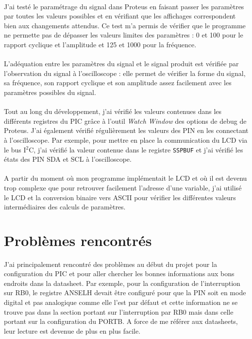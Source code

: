 \documentclass{article}
\begin{document}
    \paragraph{}
    J'ai testé le paramétrage du signal dans Proteus en faisant passer les paramètres par toutes les valeurs possibles et en vérifiant que les affichages correspondent bien aux changements attendus. Ce test m'a permis de vérifier que le programme ne permette pas de dépasser les valeurs limites des paramètres : 0 et 100 pour le rapport cyclique et l'amplitude et 125 et 1000 pour la fréquence.

    \paragraph{}
    L'adéquation entre les paramètres du signal et le signal produit est vérifiée par l'observation du signal à l'oscilloscope : elle permet de vérifier la forme du signal, sa fréquence, son rapport cyclique et son amplitude assez facilement avec les paramètres possibles du signal.

    \paragraph{}
    Tout au long du développement, j'ai vérifié les valeurs contenues dans les différents registres du PIC grâce à l'outil \emph{Watch Window} des options de debug de Proteus. J'ai également vérifié régulièrement les valeurs des PIN en les connectant à l'oscilloscope. Par exemple, pour mettre en place la communication du LCD via le bus I$^2$C, j'ai vérifié la valeur contenue dans le registre \texttt{SSPBUF} et j'ai vérifié les états des PIN SDA et SCL à l'oscilloscope.

    \paragraph{}
    A partir du moment où mon programme implémentait le LCD et où il est devenu trop complexe que pour retrouver facilement l'adresse d'une variable, j'ai utilisé le LCD et la conversion binaire vers ASCII pour vérifier les différentes valeurs intermédiaires des calculs de paramètres.



    \section{Problèmes rencontrés}
    \paragraph{}
    J'ai principalement rencontré des problèmes au début du projet pour la configuration du PIC et pour aller chercher les bonnes informations aux bons endroits dans la datasheet. Par exemple, pour la configuration de l'interruption sur RB0, le registre ANSELH devait être configuré pour que la PIN soit en mode digital et pas analogique comme elle l'est par défaut et cette information ne se trouve pas dans la section portant sur l'interruption par RB0 mais dans celle portant sur la configuration du PORTB. A force de me référer aux datasheets, leur lecture est devenue de plus en plus facile.
\end{document}
